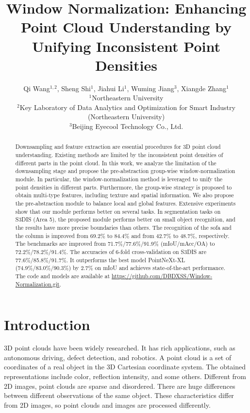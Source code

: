 \documentclass[10pt,twocolumn,letterpaper]{article}
\begin{document}
\title{Window Normalization: Enhancing Point Cloud Understanding by Unifying Inconsistent Point Densities}



\author{
    Qi Wang$^{1,2}$,
    Sheng Shi$^{1}$\footnotemark[1],
    Jiahui Li$^{1}$,
    Wuming Jiang$^{3}$,
    Xiangde Zhang$^{1}$\\
    $^1$Northeastern University \\
    $^2$Key Laboratory of Data Analytics and Optimization for Smart Industry (Northeastern University) \\
    $^3$Beijing Eyecool Technology Co., Ltd. \\
}
\maketitle

\begin{abstract}
  Downsampling and feature extraction are essential procedures for 3D point cloud understanding.
  Existing methods are limited by the inconsistent point densities of different parts in the point cloud.
  In this work, we analyze the limitation of the downsampling stage and propose the pre-abstraction group-wise window-normalization module.
  In particular, the window-normalization method is leveraged to unify the point densities in different parts.
  Furthermore, the group-wise strategy is proposed to obtain multi-type features, including texture and spatial information.
  We also propose the pre-abstraction module to balance local and global features.
  Extensive experiments show that our module performs better on several tasks.
  In segmentation tasks on S3DIS (Area 5), the proposed module performs better on small object recognition, and the results have more precise boundaries than others.
  The recognition of the sofa and the column is improved from 69.2\% to 84.4\% and from 42.7\% to 48.7\%, respectively.
  The benchmarks are improved from 71.7\%/77.6\%/91.9\% (mIoU/mAcc/OA) to 72.2\%/78.2\%/91.4\%.
  The accuracies of 6-fold cross-validation on S3DIS are 77.6\%/85.8\%/91.7\%.
  It outperforms the best model PointNeXt-XL (74.9\%/83.0\%/90.3\%) by 2.7\% on mIoU and achieves state-of-the-art performance.
  The code and models are available at  \url{https://github.com/DBDXSS/Window-Normalization.git}.
\end{abstract}




\section{Introduction}
    \label{sec:1}
    3D point clouds have been widely researched. It has rich applications, such as autonomous driving, defect detection, and robotics. A point cloud is a set of coordinates of a real object in the 3D Cartesian coordinate system. The obtained representations include color, reflection intensity, and some others. Different from 2D images, point clouds are sparse and disordered. There are huge differences between different observations of the same object. These characteristics differ from 2D images, so point clouds and images are processed differently.
\end{document}
